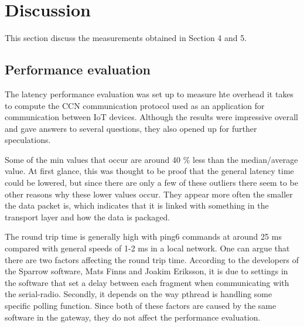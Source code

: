 \section{Discussion}
This section discuss the measurements obtained in Section 4 and 5. %

\subsection{Performance evaluation}
The latency performance evaluation was set up to measure hte overhead it takes to compute the CCN communication protocol used as an application for communication between IoT devices. Although the results were impressive overall and gave answers to several questions, they also opened up for further speculations.

Some of the min values that occur are around 40 $\%$ less than the median/average value. At first glance, this was thought to be proof that the general latency time could be lowered, but since there are only a few of these outliers there seem to be other reasons why these lower values occur. They appear more often the smaller the data packet is, which indicates that it is linked with something in the transport layer and how the data is packaged.
%

The round trip time is generally high with ping6 commands at around 25 ms compared with general speeds of 1-2 ms in a local network. One can argue that there are two factors affecting the round trip time. According to the developers of the Sparrow software, Mats Finns and Joakim Eriksson, it is due to settings in the software that set a delay between each fragment when communicating with the serial-radio. Secondly, it depends on the way pthread is handling some specific polling function. Since both of these factors are caused by the same software in the gateway, they do not affect the performance evaluation.

